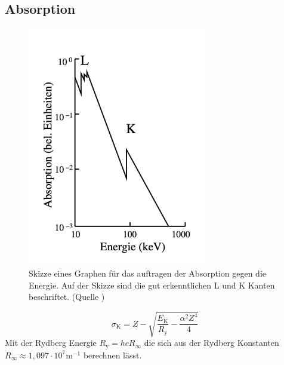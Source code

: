 \subsection{Absorption}
\begin{figure}
    \centering
    \includegraphics[width=0.7\textwidth]{bilder/Absorption.png}
    \caption{Skizze eines Graphen für das auftragen der Absorption gegen die Energie. Auf der Skizze sind die gut erkenntlichen L und K Kanten beschriftet. (Quelle \cite{Anleitung})}
    \label{fig:Absorption}
\end{figure}

\begin{equation}
    \sigma_{\text{K}} = Z - \sqrt{\frac{E_{\text{K}}}{R_{\text{y}}}-\frac{\alpha^2Z^4}{4}} \label{eqn:Sigma}
\end{equation}
Mit der Rydberg Energie $R_{\text{y}} = hcR_{\infty}$ die sich aus der Rydberg Konstanten $R_{\infty} ≈ 1,097 \cdot 10^{7} \text{m}^{-1}$ berechnen lässt.

